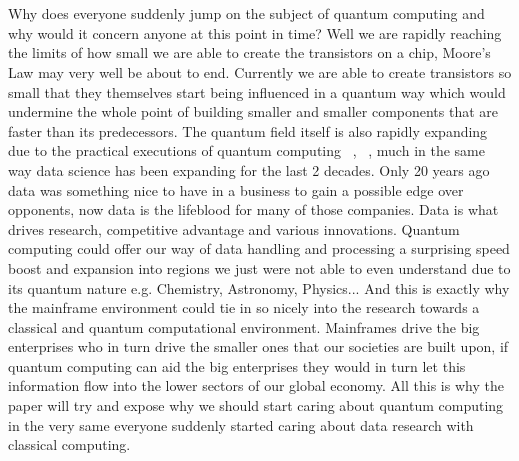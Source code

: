 
\chapter{}
\label{ch:inleiding}

Why does everyone suddenly jump on the subject of quantum computing and why would it concern anyone at this point in time? Well we are rapidly reaching the limits of how small we are able to create the transistors on a chip, Moore's Law may very well be about to end. Currently we are able to create transistors so small that they themselves start being influenced in a quantum way which would undermine the whole point of building smaller and smaller components that are faster than its predecessors. The quantum field itself is also rapidly expanding due to the practical executions of quantum computing ~\textcite{Google2019}, ~\textcite{IBM2019}, much in the same way data science has been expanding for the last 2 decades. Only 20 years ago data was something nice to have in a business to gain a possible edge over opponents, now data is the lifeblood for many of those companies. Data is what drives research, competitive advantage and various innovations. Quantum computing could offer our way of data handling and processing a surprising speed boost and expansion into regions we just were not able to even understand due to its quantum nature e.g. Chemistry, Astronomy, Physics...  And this is exactly why the mainframe environment could tie in so nicely into the research towards a classical and quantum computational environment. Mainframes drive the big enterprises who in turn drive the smaller ones that our societies are built upon, if quantum computing can aid the big enterprises they would in turn let this information flow into the lower sectors of our global economy. All this is why the paper will try and expose why we should start caring about quantum computing in the very same everyone suddenly started caring about data research with classical computing.


\section{}
\label{sec:probleemstelling}

